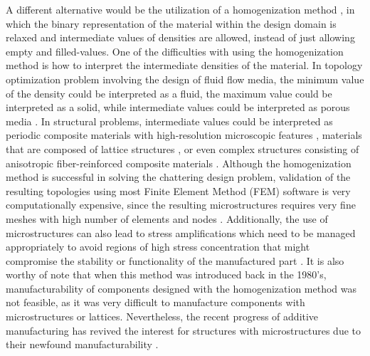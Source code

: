 \documentclass[../main.tex]{subfiles}
\begin{document}
A different alternative would be the utilization of a homogenization method \cite{bendsoeOptimizationStructuralTopology1995}, \cite{allaireShapeOptimizationHomogenization2002} \cite{suzukiHomogenizationMethodShape1991} in which the binary representation of the material within the design domain is relaxed and intermediate values of densities are allowed, instead of just allowing empty and filled-values. One of the difficulties with using the homogenization method is how to interpret the intermediate densities of the material. In topology optimization problem involving the design of fluid flow media, the minimum value of the density could be interpreted as a fluid, the maximum value could be interpreted as a solid, while intermediate values could be interpreted as porous media \cite{pietropaoliThreedimensionalFluidTopology2019}. In structural problems, intermediate values could be interpreted as periodic composite materials with high-resolution microscopic features \cite{groenHomogenizationbasedTopologyOptimization2018} \cite{alexandersenTopologyOptimisationManufacturable2015}, materials that are composed of lattice structures \cite{allaireTopologyOptimizationModulated2019}, or even complex structures consisting of anisotropic fiber-reinforced composite materials \cite{kimTopologyOptimizationFunctionally2020}. Although the homogenization method is successful in solving the chattering design problem, validation of the resulting topologies using most Finite Element Method (FEM) software is very computationally expensive, since the resulting microstructures requires very fine meshes with high number of elements and nodes \cite{kimComputationalHomogenizationAdditively2022}. Additionally, the use of microstructures can also lead to stress amplifications which need to be managed appropriately to avoid regions of high stress concentration that might compromise the stability or functionality of the manufactured part \cite{allaireTopologyOptimizationMinimum2004}. It is also worthy of note that when this method was introduced back in the 1980's, manufacturability of components designed with the homogenization method was not feasible, as it was very difficult to manufacture components with microstructures or lattices. Nevertheless, the recent progress of additive manufacturing has revived the interest for structures with microstructures due to their newfound manufacturability \cite{allaireHomogenizationMethodTopology2019}.
\end{document}
